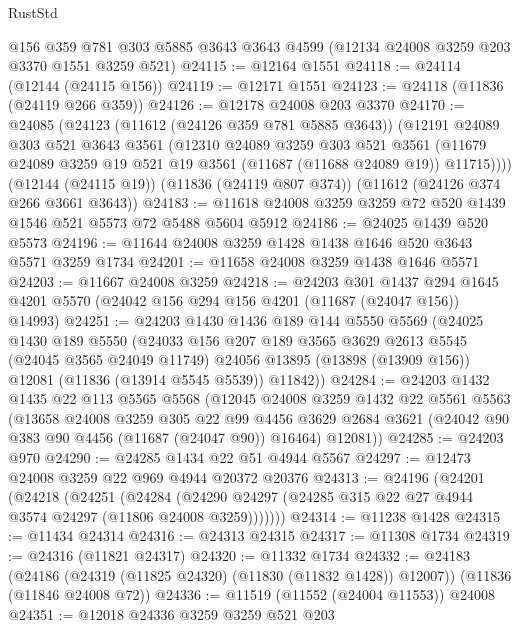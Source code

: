 \begin{lexlean}{RustStd}
\begin{coremodule}
    @156
    @359
    @781
    @303
    @5885
    @3643
    @3643
    @4599
    (@12134 @24008 @3259 @203 @3370 @1551 @3259 @521)
@24115 := @12164 @1551
@24118 := @24114 (@12144 (@24115 @156))
@24119 := @12171 @1551
@24123 := @24118 (@11836 (@24119 @266 @359))
@24126 := @12178 @24008 @203 @3370
@24170 := @24085
    (@24123
      (@11612 (@24126 @359 @781 @5885 @3643))
      (@12191
        @24089
        @303
        @521
        @3643
        @3561
        (@12310
          @24089
          @3259
          @303
          @521
          @3561
          (@11679 @24089 @3259 @19 @521 @19 @3561 (@11687 (@11688 @24089 @19)) @11715))))
    (@12144 (@24115 @19))
    (@11836 (@24119 @807 @374))
    (@11612 (@24126 @374 @266 @3661 @3643))
@24183 := @11618 @24008 @3259 @3259 @72 @520 @1439 @1546 @521 @5573 @72 @5488 @5604 @5912
@24186 := @24025 @1439 @520 @5573
@24196 := @11644 @24008 @3259 @1428 @1438 @1646 @520 @3643 @5571 @3259 @1734
@24201 := @11658 @24008 @3259 @1438 @1646 @5571
@24203 := @11667 @24008 @3259
@24218 := @24203
    @301
    @1437
    @294
    @1645
    @4201
    @5570
    (@24042 @156 @294 @156 @4201 (@11687 (@24047 @156)) @14993)
@24251 := @24203
    @1430
    @1436
    @189
    @144
    @5550
    @5569
    (@24025
      @1430
      @189
      @5550
      (@24033
        @156
        @207
        @189
        @3565
        @3629
        @2613
        @5545
        (@24045 @3565 @24049 @11749)
        @24056
        @13895
        (@13898 (@13909 @156))
        @12081
        (@11836 (@13914 @5545 @5539))
        @11842))
@24284 := @24203
    @1432
    @1435
    @22
    @113
    @5565
    @5568
    (@12045
      @24008
      @3259
      @1432
      @22
      @5561
      @5563
      (@13658
        @24008
        @3259
        @305
        @22
        @99
        @4456
        @3629
        @2684
        @3621
        (@24042 @90 @383 @90 @4456 (@11687 (@24047 @90)) @16464)
        @12081))
@24285 := @24203 @970
@24290 := @24285 @1434 @22 @51 @4944 @5567
@24297 := @12473 @24008 @3259 @22 @969 @4944 @20372 @20376
@24313 := @24196
    (@24201
      (@24218
        (@24251
          (@24284 (@24290 @24297 (@24285 @315 @22 @27 @4944 @3574 @24297 (@11806 @24008 @3259)))))))
@24314 := @11238 @1428
@24315 := @11434 @24314
@24316 := @24313 @24315
@24317 := @11308 @1734
@24319 := @24316 (@11821 @24317)
@24320 := @11332 @1734
@24332 := @24183
    (@24186 (@24319 (@11825 @24320) (@11830 (@11832 @1428)) @12007))
    (@11836 (@11846 @24008 @72))
@24336 := @11519 (@11552 (@24004 @11553)) @24008
@24351 := @12018
    @24336
    @3259
    @3259
    @521
    @203

\end{coremodule}
\end{lexlean}
